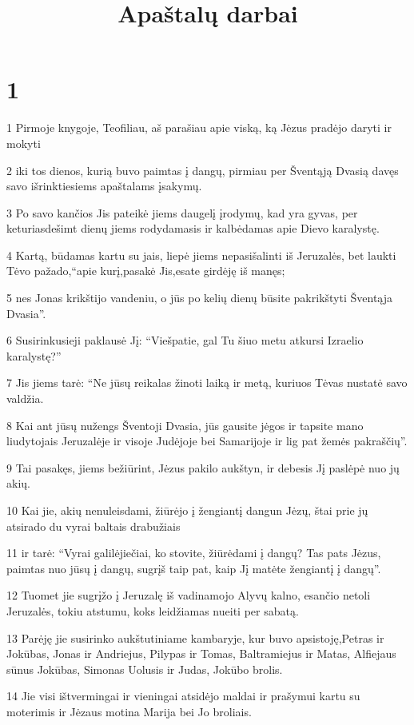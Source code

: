 

\title{Apaštalų darbai}

\chapter{1}


\par 1 Pirmoje knygoje, Teofiliau, aš parašiau apie viską, ką Jėzus pradėjo daryti ir mokyti 
\par 2 iki tos dienos, kurią buvo paimtas į dangų, pirmiau per Šventąją Dvasią davęs savo išrinktiesiems apaštalams įsakymų. 
\par 3 Po savo kančios Jis pateikė jiems daugelį įrodymų, kad yra gyvas, per keturiasdešimt dienų jiems rodydamasis ir kalbėdamas apie Dievo karalystę. 
\par 4 Kartą, būdamas kartu su jais, liepė jiems nepasišalinti iš Jeruzalės, bet laukti Tėvo pažado,­“apie kurį,­pasakė Jis,­esate girdėję iš manęs; 
\par 5 nes Jonas krikštijo vandeniu, o jūs po kelių dienų būsite pakrikštyti Šventąja Dvasia”. 
\par 6 Susirinkusieji paklausė Jį: “Viešpatie, gal Tu šiuo metu atkursi Izraelio karalystę?” 
\par 7 Jis jiems tarė: “Ne jūsų reikalas žinoti laiką ir metą, kuriuos Tėvas nustatė savo valdžia. 
\par 8 Kai ant jūsų nužengs Šventoji Dvasia, jūs gausite jėgos ir tapsite mano liudytojais Jeruzalėje ir visoje Judėjoje bei Samarijoje ir lig pat žemės pakraščių”. 
\par 9 Tai pasakęs, jiems bežiūrint, Jėzus pakilo aukštyn, ir debesis Jį paslėpė nuo jų akių. 
\par 10 Kai jie, akių nenuleisdami, žiūrėjo į žengiantį dangun Jėzų, štai prie jų atsirado du vyrai baltais drabužiais 
\par 11 ir tarė: “Vyrai galilėjiečiai, ko stovite, žiūrėdami į dangų? Tas pats Jėzus, paimtas nuo jūsų į dangų, sugrįš taip pat, kaip Jį matėte žengiantį į dangų”. 
\par 12 Tuomet jie sugrįžo į Jeruzalę iš vadinamojo Alyvų kalno, esančio netoli Jeruzalės, tokiu atstumu, koks leidžiamas nueiti per sabatą. 
\par 13 Parėję jie susirinko aukštutiniame kambaryje, kur buvo apsistoję,­Petras ir Jokūbas, Jonas ir Andriejus, Pilypas ir Tomas, Baltramiejus ir Matas, Alfiejaus sūnus Jokūbas, Simonas Uolusis ir Judas, Jokūbo brolis. 
\par 14 Jie visi ištvermingai ir vieningai atsidėjo maldai ir prašymui kartu su moterimis ir Jėzaus motina Marija bei Jo broliais. 
